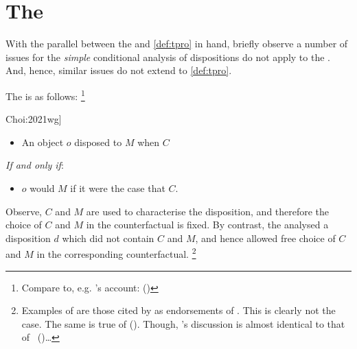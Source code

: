 \section{The \dSCA{}}
\label{sec:dsca2}


\begin{note}
  With the parallel between the \dBCAa{} and \autoref{def:tpro} in hand, briefly observe a number of issues for the \emph{simple} conditional analysis of dispositions do not apply to the \dBCAa{}.
  And, hence, similar issues do not extend to \autoref{def:tpro}.

  The \dSCA{} is as follows:%
  \footnote{
    Compare to, e.g. \citeauthor{Lewis:1997wg}'s account:
    (\citeyear[143]{Lewis:1997wg})
  }

  \begin{sketch}[The \dSCA{} --- \dSCAa{}, cf.\ \cite[\S1.2]{Choi:2021wg}]%
    \label{sketch:dSCA}
    \vspace{-\baselineskip}
    \begin{itemize}
    \item
      An object \(o\) disposed to \(M\) when \(C\)
    \end{itemize}
    \emph{If and only if}:
    \begin{itemize}
    \item
      \(o\) would \(M\) if it were the case that \(C\).
    \end{itemize}
    \vspace{-\baselineskip}
  \end{sketch}

  \noindent%
  Observe, \(C\) and \(M\) are used to characterise the disposition, and therefore the choice of \(C\) and \(M\) in the counterfactual is fixed.
  By contrast, the \dBCAa{} analysed a disposition \(d\) which did not contain \(C\) and \(M\), and hence allowed free choice of \(C\) and \(M\) in the corresponding counterfactual.%
    \footnote{
    Examples of  are those cited by \citeauthor{Choi:2021wg} as endorsements of .
    This is clearly not the case.
    The same is true of \citeauthor{Manley:2008aa} (\citeyear[60]{Manley:2008aa}).
    Though, \citeauthor{Manley:2008aa}'s discussion is almost identical to that of \citeauthor{Fara:2006aa}~(\citeyear[\S2.1]{Fara:2006aa})\dots

}
\end{note}
